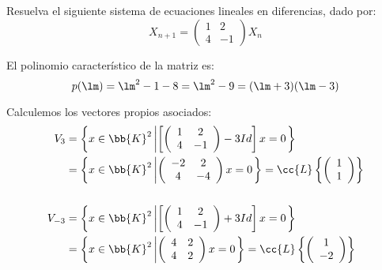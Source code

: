 \begin{ejemplo}\label{ejemplo:SistSinDiagonalizar}
    Resuelva el siguiente sistema de ecuaciones lineales en diferencias, dado por:
    $$X_{n+1} = \begin{pmatrix}
            1 & 2\\
            4 & -1
        \end{pmatrix}X_n$$

    El polinomio característico de la matriz es:
    \begin{equation*}
        p(\lm) = \lm^2-1-8 = \lm^2-9 = (\lm+3)(\lm-3)
    \end{equation*}

    Calculemos los vectores propios asociados:
    \begin{align*}
        V_{3} &= \left\{x\in \bb{K}^2 \left|\left[\left(
        \begin{array}{cc}
            1 & 2\\
            4 & -1
        \end{array}
        \right)-3Id\right]x = 0\right.\right\} \\
        &= \left\{x\in \bb{K}^2 \left|\left(
        \begin{array}{cc}
            -2 & 2\\
            4 & -4
        \end{array}
        \right)x = 0\right.\right\}
        = \cc{L}\left\{\left(
        \begin{array}{c}
            1\\1
        \end{array}
        \right)\right\} \\ \\
        V_{-3} &= \left\{x\in \bb{K}^2 \left|\left[\left(
        \begin{array}{cc}
            1 & 2\\
            4 & -1
        \end{array}
        \right)+3Id\right]x = 0\right.\right\} \\
        &= \left\{x\in \bb{K}^2 \left|\left(
        \begin{array}{cc}
            4 & 2\\
            4 & 2
        \end{array}
        \right)x = 0\right.\right\}
        = \cc{L}\left\{\left(
        \begin{array}{c}
            1\\-2
        \end{array}
        \right)\right\}
    \end{align*}


\end{ejemplo}
